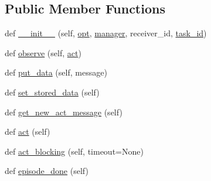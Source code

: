 \subsection*{Public Member Functions}
\begin{DoxyCompactItemize}
\item 
def \hyperlink{classparlai_1_1chat__service_1_1core_1_1agents_1_1ChatServiceAgent_a75af2a1c4766564b0143595ed8a5e3c9}{\+\_\+\+\_\+init\+\_\+\+\_\+} (self, \hyperlink{classparlai_1_1core_1_1agents_1_1Agent_ab3b45d2754244608c75d4068b90cd051}{opt}, \hyperlink{classparlai_1_1chat__service_1_1core_1_1agents_1_1ChatServiceAgent_a8216a688db46e2aa7cdd023016ecf27c}{manager}, receiver\+\_\+id, \hyperlink{classparlai_1_1chat__service_1_1core_1_1agents_1_1ChatServiceAgent_a1f1f978765ae81ca5ec8d04d14575386}{task\+\_\+id})
\item 
def \hyperlink{classparlai_1_1chat__service_1_1core_1_1agents_1_1ChatServiceAgent_a4b7ec3cb69f7e3f00b160f8474c344cc}{observe} (self, \hyperlink{classparlai_1_1chat__service_1_1core_1_1agents_1_1ChatServiceAgent_afbb942bd61c840d55354e5cfea6a1f4d}{act})
\item 
def \hyperlink{classparlai_1_1chat__service_1_1core_1_1agents_1_1ChatServiceAgent_a7a066db782ac2ebd1e2f704354c9f348}{put\+\_\+data} (self, message)
\item 
def \hyperlink{classparlai_1_1chat__service_1_1core_1_1agents_1_1ChatServiceAgent_aec768d94205566700ac4addfc4740166}{set\+\_\+stored\+\_\+data} (self)
\item 
def \hyperlink{classparlai_1_1chat__service_1_1core_1_1agents_1_1ChatServiceAgent_ac1fbe6b38906f3d52fb49dd682086866}{get\+\_\+new\+\_\+act\+\_\+message} (self)
\item 
def \hyperlink{classparlai_1_1chat__service_1_1core_1_1agents_1_1ChatServiceAgent_afbb942bd61c840d55354e5cfea6a1f4d}{act} (self)
\item 
def \hyperlink{classparlai_1_1chat__service_1_1core_1_1agents_1_1ChatServiceAgent_a386384cd487b710309328904ae79749d}{act\+\_\+blocking} (self, timeout=None)
\item 
def \hyperlink{classparlai_1_1chat__service_1_1core_1_1agents_1_1ChatServiceAgent_afcc6a8b904305b7b34d47ddfa99327ef}{episode\+\_\+done} (self)
\end{DoxyCompactItemize}
